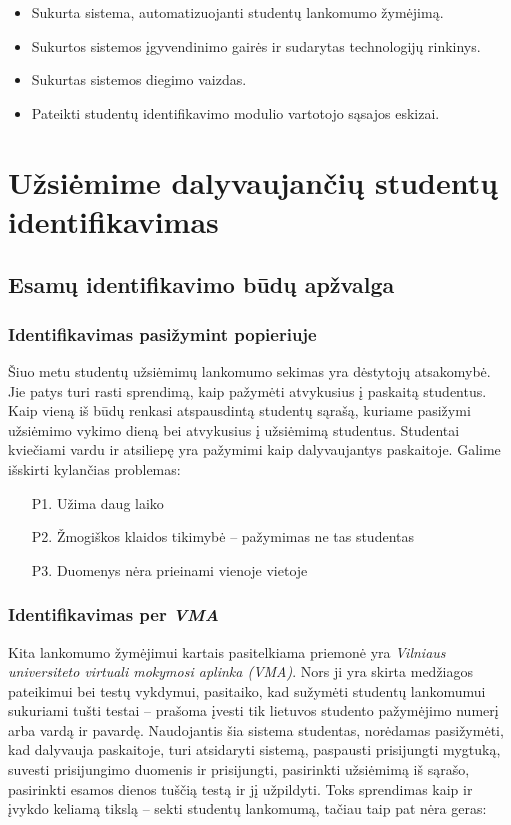\documentclass{VUMIFPSkursinis}
\begin{document}

\begin{itemize}
	\item Sukurta sistema, automatizuojanti studentų lankomumo žymėjimą.
	\item Sukurtos sistemos įgyvendinimo gairės ir sudarytas technologijų rinkinys.
	\item Sukurtas sistemos diegimo vaizdas.
	\item Pateikti studentų identifikavimo modulio vartotojo sąsajos eskizai.
\end{itemize}

\section{Užsiėmime dalyvaujančių studentų identifikavimas}

\subsection{Esamų identifikavimo būdų apžvalga}

\subsubsection{Identifikavimas pasižymint popieriuje}

Šiuo metu studentų užsiėmimų lankomumo sekimas yra dėstytojų atsakomybė. Jie patys turi rasti sprendimą, kaip pažymėti atvykusius į paskaitą studentus. Kaip vieną iš būdų renkasi atspausdintą studentų sąrašą, kuriame pasižymi užsiėmimo vykimo dieną bei atvykusius į užsiėmimą studentus. Studentai kviečiami vardu ir atsiliepę yra pažymimi kaip dalyvaujantys paskaitoje. Galime išskirti kylančias problemas:

\begin{itemize}
    \item[P1.] Užima daug laiko
    \item[P2.] Žmogiškos klaidos tikimybė – pažymimas ne tas studentas
    \item[P3.] Duomenys nėra prieinami vienoje vietoje
\end{itemize}

\subsubsection{Identifikavimas per \textit{VMA}}

Kita lankomumo žymėjimui kartais pasitelkiama priemonė yra \textit{Vilniaus universiteto virtuali mokymosi aplinka (VMA)}. Nors ji yra skirta medžiagos pateikimui bei testų vykdymui, pasitaiko, kad sužymėti studentų lankomumui sukuriami tušti testai – prašoma įvesti tik lietuvos studento pažymėjimo numerį arba vardą ir pavardę. Naudojantis šia sistema studentas, norėdamas pasižymėti, kad dalyvauja paskaitoje, turi atsidaryti sistemą, paspausti prisijungti mygtuką, suvesti prisijungimo duomenis ir prisijungti, pasirinkti užsiėmimą iš sąrašo, pasirinkti esamos dienos tuščią testą ir jį užpildyti. Toks sprendimas kaip ir įvykdo keliamą tikslą – sekti studentų lankomumą, tačiau taip pat nėra geras:
\end{document}
